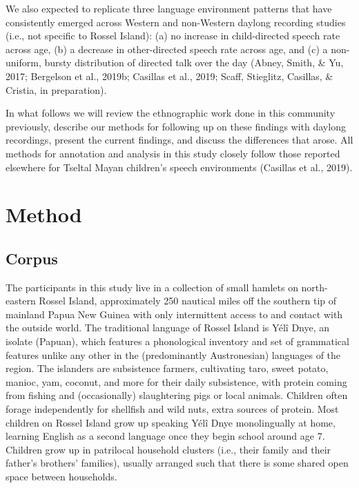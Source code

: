 \documentclass[,man,floatsintext]{apa6}
\begin{document}
We also expected to replicate three language environment patterns that
have consistently emerged across Western and non-Western daylong
recording studies (i.e., not specific to Rossel Island): (a) no increase
in child-directed speech rate across age, (b) a decrease in
other-directed speech rate across age, and (c) a non-uniform, bursty
distribution of directed talk over the day (Abney, Smith, \& Yu, 2017;
Bergelson et al., 2019b; Casillas et al., 2019; Scaff, Stieglitz,
Casillas, \& Cristia, in preparation).

In what follows we will review the ethnographic work done in this
community previously, describe our methods for following up on these
findings with daylong recordings, present the current findings, and
discuss the differences that arose. All methods for annotation and
analysis in this study closely follow those reported elsewhere for
Tseltal Mayan children's speech environments (Casillas et al., 2019).

\section{Method}\label{methods}

\subsection{Corpus}\label{methods-dataset}

The participants in this study live in a collection of small hamlets on
north-eastern Rossel Island, approximately 250 nautical miles off the
southern tip of mainland Papua New Guinea with only intermittent access
to and contact with the outside world. The traditional language of
Rossel Island is Yélî Dnye, an isolate (Papuan), which features a
phonological inventory and set of grammatical features unlike any other
in the (predominantly Austronesian) languages of the region. The
islanders are subsistence farmers, cultivating taro, sweet potato,
manioc, yam, coconut, and more for their daily subsistence, with protein
coming from fishing and (occasionally) slaughtering pigs or local
animals. Children often forage independently for shellfish and wild
nuts, extra sources of protein. Most children on Rossel Island grow up
speaking Yélî Dnye monolingually at home, learning English as a second
language once they begin school around age 7. Children grow up in
patrilocal household clusters (i.e., their family and their father's
brothers' families), usually arranged such that there is some shared
open space between households.
\end{document}

